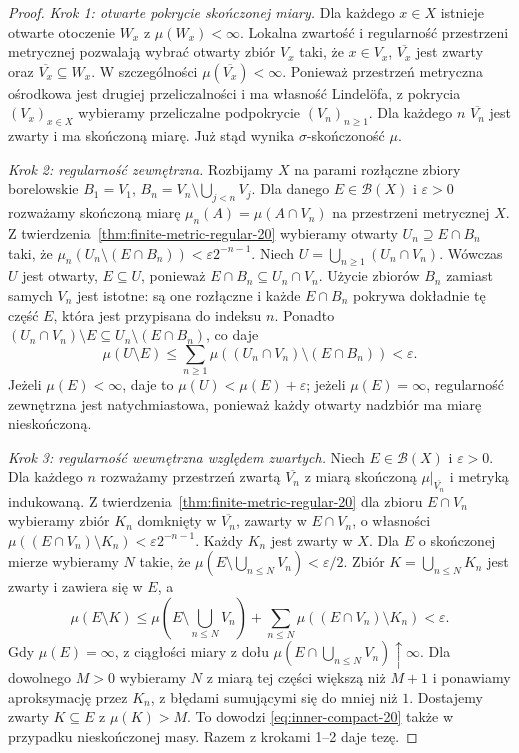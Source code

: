 \documentclass[11pt,a4paper,oneside]{book}
\numberwithin{equation}{chapter}
\theoremstyle{plain}
\theoremstyle{definition}
\theoremstyle{remark}
\begin{document}
\begin{proof}
\emph{Krok 1: otwarte pokrycie skończonej miary.}
Dla każdego $x\in X$ istnieje otwarte otoczenie $W_x$
z $\mu(W_x)<\infty$. Lokalna zwartość i regularność
przestrzeni metrycznej pozwalają wybrać otwarty zbiór
$V_x$ taki, że $x\in V_x$, $\overline{V_x}$ jest zwarty
oraz $\overline{V_x}\subseteq W_x$.
W szczególności $\mu(\overline{V_x})<\infty$.
Ponieważ przestrzeń metryczna ośrodkowa jest drugiej
przeliczalności i ma własność Lindelöfa,
z pokrycia $(V_x)_{x\in X}$ wybieramy przeliczalne
podpokrycie $(V_n)_{n\ge1}$. Dla każdego $n$
$\overline{V_n}$ jest zwarty i ma skończoną miarę.
Już stąd wynika $\sigma$-skończoność $\mu$.

\emph{Krok 2: regularność zewnętrzna.}
Rozbijamy $X$ na parami rozłączne zbiory borelowskie
$B_1=V_1$, $B_n=V_n\setminus\bigcup_{j<n}V_j$.
Dla danego $E\in\mathcal B(X)$ i $\varepsilon>0$
rozważamy skończoną miarę
$\mu_n(A)=\mu(A\cap V_n)$ na przestrzeni metrycznej $X$.
Z twierdzenia~\ref{thm:finite-metric-regular-20}
wybieramy otwarty $U_n\supseteq E\cap B_n$ taki, że
$\mu_n(U_n\setminus(E\cap B_n))<\varepsilon2^{-n-1}$.
Niech $U=\bigcup_{n\ge1}(U_n\cap V_n)$.
Wówczas $U$ jest otwarty, $E\subseteq U$, ponieważ
$E\cap B_n\subseteq U_n\cap V_n$. Użycie zbiorów
$B_n$ zamiast samych $V_n$ jest istotne: są one
rozłączne i każde $E\cap B_n$ pokrywa dokładnie tę
część $E$, która jest przypisana do indeksu $n$.
Ponadto $(U_n\cap V_n)\setminus E\subseteq
U_n\setminus(E\cap B_n)$, co daje
\[
\mu(U\setminus E)
\le\sum_{n\ge1}\mu((U_n\cap V_n)\setminus(E\cap B_n))
<\varepsilon.
\]
Jeżeli $\mu(E)<\infty$, daje to
$\mu(U)<\mu(E)+\varepsilon$; jeżeli $\mu(E)=\infty$,
regularność zewnętrzna jest natychmiastowa,
ponieważ każdy otwarty nadzbiór ma miarę nieskończoną.

\emph{Krok 3: regularność wewnętrzna względem zwartych.}
Niech $E\in\mathcal B(X)$ i $\varepsilon>0$.
Dla każdego $n$ rozważamy przestrzeń zwartą
$\overline{V_n}$ z miarą skończoną
$\mu|_{\overline{V_n}}$ i metryką indukowaną.
Z twierdzenia~\ref{thm:finite-metric-regular-20}
dla zbioru $E\cap V_n$ wybieramy zbiór
$K_n$ domknięty w $\overline{V_n}$, zawarty w
$E\cap V_n$, o własności
$\mu((E\cap V_n)\setminus K_n)<\varepsilon2^{-n-1}$.
Każdy $K_n$ jest zwarty w $X$.
Dla $E$ o skończonej mierze wybieramy $N$ takie, że
$\mu(E\setminus\bigcup_{n\le N}V_n)<\varepsilon/2$.
Zbiór $K=\bigcup_{n\le N}K_n$ jest zwarty i zawiera się
w $E$, a
\[
 \mu(E\setminus K)
 \le\mu(E\setminus\bigcup_{n\le N}V_n)
 +\sum_{n\le N}\mu((E\cap V_n)\setminus K_n)
 <\varepsilon.
\]
Gdy $\mu(E)=\infty$, z ciągłości miary z dołu
$\mu(E\cap\bigcup_{n\le N}V_n)\uparrow\infty$.
Dla dowolnego $M>0$ wybieramy $N$ z miarą tej części
większą niż $M+1$ i ponawiamy aproksymację przez
$K_n$, z błędami sumującymi się do mniej niż $1$.
Dostajemy zwarty $K\subseteq E$ z $\mu(K)>M$.
To dowodzi \eqref{eq:inner-compact-20} także w przypadku
nieskończonej masy. Razem z krokami 1--2 daje tezę.
\end{proof}
\end{document}
